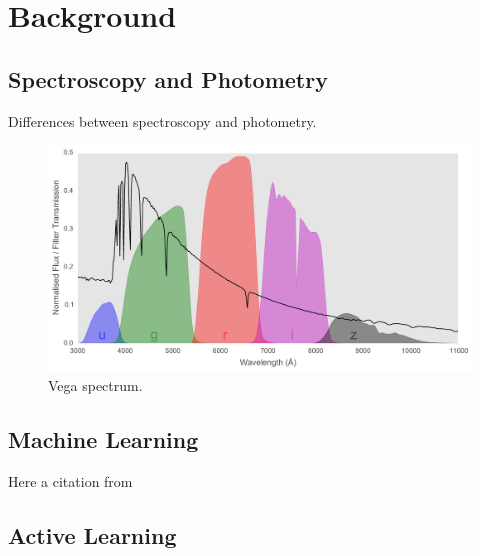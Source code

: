 
\chapter{Background}
\label{cha:firstexp}

\section{Spectroscopy and Photometry}
\label{sec:why1}

Differences between spectroscopy and photometry.

\begin{figure}[h]
	\centering
	\includegraphics[width=\textwidth]{figures/vega_filters_and_spectrum}
	\caption{Vega spectrum.}
	\label{fig:vega}
\end{figure}



\section{Machine Learning}
\label{sec:what1}

Here a citation from \cite{wolf14}


\section{Active Learning}
\label{sec:active_background}


